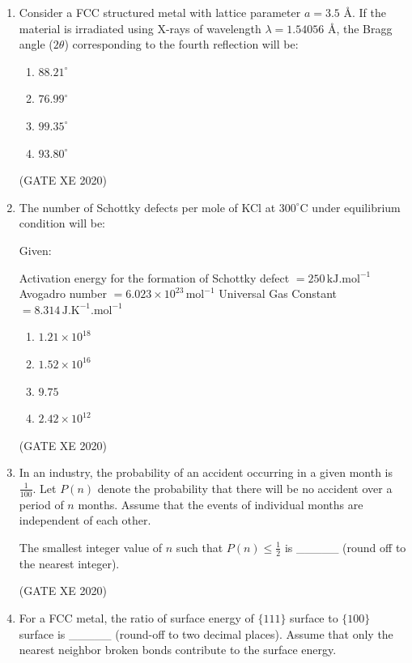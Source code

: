 \documentclass[12pt]{article}
\begin{document}
\begin{enumerate}
(GATE XE 2020)

\item Consider a FCC structured metal with lattice parameter $a = 3.5$ \AA. If the material is irradiated using X-rays of wavelength $\lambda = 1.54056$ \AA, the Bragg angle ($2\theta$) corresponding to the fourth reflection will be:  

\begin{enumerate}
    \item $88.21^\circ$
    \item $76.99^\circ$
    \item $99.35^\circ$
    \item $93.80^\circ$
\end{enumerate}

(GATE XE 2020)

\item The number of Schottky defects per mole of KCl at $300^{\circ} \mathrm{C}$ under equilibrium condition will be:

Given:  

Activation energy for the formation of Schottky defect $= 250 \,\text{kJ.mol}^{-1}$  
Avogadro number $= 6.023 \times 10^{23}\,\text{mol}^{-1}$  
Universal Gas Constant $= 8.314 \,\text{J.K}^{-1}\text{.mol}^{-1}$  

\begin{enumerate}
\item $1.21 \times 10^{18}$
\item $1.52 \times 10^{16}$
\item $9.75$
\item $2.42 \times 10^{12}$
\end{enumerate}

(GATE XE 2020)

\item In an industry, the probability of an accident occurring in a given month is $\tfrac{1}{100}$.  
Let $P(n)$ denote the probability that there will be no accident over a period of $n$ months. Assume that the events of individual months are independent of each other.  

The smallest integer value of $n$ such that $P(n) \leq \tfrac{1}{2}$ is \_\_\_\_\_ (round off to the nearest integer).

(GATE XE 2020)

\item For a FCC metal, the ratio of surface energy of $\{111\}$ surface to $\{100\}$ surface is \_\_\_\_\_ (round-off to two decimal places). Assume that only the nearest neighbor broken bonds contribute to the surface energy.


\end{enumerate}
\end{document}
